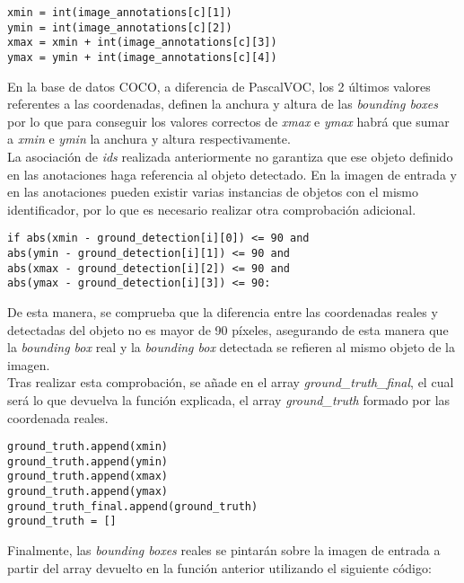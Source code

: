 \documentclass[a4paper, 12pt, spanish, chapterprefix, numbers=noenddot]{book}
\begin{document}
\begin{lstlisting}[frame=single]
xmin = int(image_annotations[c][1])
ymin = int(image_annotations[c][2])
xmax = xmin + int(image_annotations[c][3])
ymax = ymin + int(image_annotations[c][4])
\end{lstlisting}

En la base de datos COCO, a diferencia de PascalVOC, los 2 últimos valores referentes a las coordenadas, definen la anchura y altura de las \textit{bounding boxes} por lo que para conseguir los valores correctos de \textit{xmax} e \textit{ymax} habrá que sumar a \textit{xmin} e \textit{ymin} la anchura y altura respectivamente.\\

La asociación de \textit{ids} realizada anteriormente no garantiza que ese objeto definido en las anotaciones haga referencia al objeto detectado. En la imagen de entrada y en las anotaciones pueden existir varias instancias de objetos con el mismo identificador, por lo que es necesario realizar otra comprobación adicional.\\

\begin{lstlisting}[frame=single]
if abs(xmin - ground_detection[i][0]) <= 90 and
abs(ymin - ground_detection[i][1]) <= 90 and
abs(xmax - ground_detection[i][2]) <= 90 and
abs(ymax - ground_detection[i][3]) <= 90:
\end{lstlisting}

De esta manera, se comprueba que la diferencia entre las coordenadas reales y detectadas del objeto no es mayor de 90 píxeles, asegurando de esta manera que la \textit{bounding box} real y la \textit{bounding box} detectada se refieren al mismo objeto de la imagen.\\

Tras realizar esta comprobación, se añade en el array \textit{ground\_truth\_final}, el cual será lo que devuelva la función explicada, el array \textit{ground\_truth} formado por las coordenada reales.\\

\begin{lstlisting}[frame=single]
ground_truth.append(xmin)
ground_truth.append(ymin)
ground_truth.append(xmax)
ground_truth.append(ymax)
ground_truth_final.append(ground_truth)
ground_truth = []
\end{lstlisting}

Finalmente, las \textit{bounding boxes} reales se pintarán sobre la imagen de entrada a partir del array devuelto en la función anterior utilizando el siguiente código:\\
\end{document}
